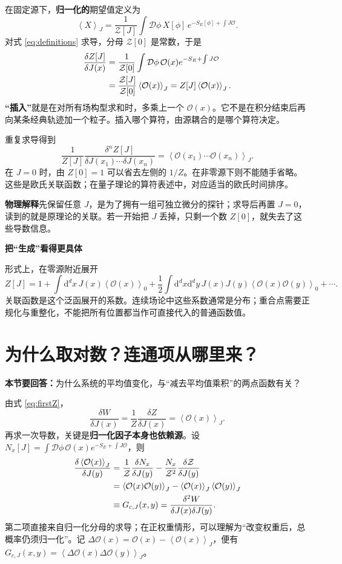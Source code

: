 \documentclass[11pt,a4paper]{article}
\newcommand{\dd}{\mathrm d}
\newcommand{\OO}{\mathcal O}
\newcommand{\ZZ}{\mathcal Z}
\newcommand{\intx}{\int\dd^d x\,}
\newcommand{\avg}[1]{\left\langle #1\right\rangle}
\newcommand{\physicsnote}[1]{\par\smallskip\noindent\colorbox{pale}{\parbox{\dimexpr\linewidth-2\fboxsep\relax}{\textbf{物理解释}\quad #1}}\par\smallskip}
\newcommand{\question}[1]{\textbf{本节要回答：}#1\par}
\newcommand{\step}[1]{\textbf{#1}\par}
\begin{document}
在固定源下，\textbf{归一化的}期望值定义为
\begin{equation}\label{eq:expectation}
 \avg{X}_J=\frac{1}{\ZZ[J]}\int\mathcal D\phi\,X[\phi]\,
 e^{-S_E[\phi]+\int J\OO}.
\end{equation}
对式 \eqref{eq:definitions} 求导，分母 \(\ZZ[0]\) 是常数，于是
\begin{align}
 \frac{\delta Z[J]}{\delta J(x)}
 &=\frac{1}{\ZZ[0]}\int\mathcal D\phi\,\OO(x)e^{-S_E+\int J\OO}\notag\\
 &=\frac{\ZZ[J]}{\ZZ[0]}\avg{\OO(x)}_J
 = Z[J]\avg{\OO(x)}_J.\label{eq:firstZ}
\end{align}
\textbf{“插入”}就是在对所有场构型求和时，多乘上一个 \(\OO(x)\)。它不是在积分结束后再向某条经典轨迹加一个粒子。插入哪个算符，由源耦合的是哪个算符决定。

重复求导得到
\begin{equation}\label{eq:nZ}
 \frac{1}{Z[J]}\frac{\delta^n Z[J]}{\delta J(x_1)\cdots\delta J(x_n)}
 =\avg{\OO(x_1)\cdots\OO(x_n)}_J.
\end{equation}
在 \(J=0\) 时，由 \(Z[0]=1\) 可以省去左侧的 \(1/Z\)。在非零源下则不能随手省略。这些是欧氏关联函数；在量子理论的算符表述中，对应适当的欧氏时间排序。

\physicsnote{先保留任意 \(J\)，是为了拥有一组可独立微分的探针；求导后再置 \(J=0\)，读到的就是原理论的关联。若一开始把 \(J\) 丢掉，只剩一个数 \(Z[0]\)，就失去了这些导数信息。}

\step{把“生成”看得更具体}
形式上，在零源附近展开
\begin{equation}
 Z[J]=1+\intx J(x)\avg{\OO(x)}_0
 +\frac12\int\dd^d x\dd^d y\,J(x)J(y)\avg{\OO(x)\OO(y)}_0+\cdots.
\end{equation}
关联函数是这个泛函展开的系数。连续场论中这些系数通常是分布；重合点需要正规化与重整化，不能把所有位置都当作可直接代入的普通函数值。

\newpage
\section{为什么取对数？连通项从哪里来？}
\question{为什么系统的平均值变化，与“减去平均值乘积”的两点函数有关？}
由式 \eqref{eq:firstZ}，
\begin{equation}
 \frac{\delta W}{\delta J(x)}=\frac{1}{Z}\frac{\delta Z}{\delta J(x)}
 =\avg{\OO(x)}_J.
\end{equation}
再求一次导数，关键是\textbf{归一化因子本身也依赖源}。设
\(N_x[J]=\int\mathcal D\phi\,\OO(x)e^{-S_E+\int J\OO}\)，则
\begin{align}
 \frac{\delta\avg{\OO(x)}_J}{\delta J(y)}
 &=\frac{1}{\ZZ}\frac{\delta N_x}{\delta J(y)}
   -\frac{N_x}{\ZZ^2}\frac{\delta\ZZ}{\delta J(y)}\notag\\
 &=\avg{\OO(x)\OO(y)}_J
   -\avg{\OO(x)}_J\avg{\OO(y)}_J\notag\\
 &\equiv G_{c,J}(x,y)
 =\frac{\delta^2 W}{\delta J(x)\delta J(y)}.\label{eq:covariance}
\end{align}
第二项直接来自归一化分母的求导；在正权重情形，可以理解为“改变权重后，总概率仍须归一化”。记
\(\Delta\OO(x)=\OO(x)-\avg{\OO(x)}_J\)，便有
\(G_{c,J}(x,y)=\avg{\Delta\OO(x)\Delta\OO(y)}_J\)。
\end{document}
